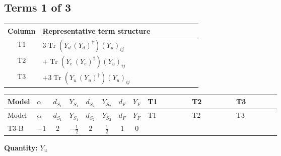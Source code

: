 \documentclass[8pt]{article}
\begin{document}
\begin{landscape}
\subsection*{Terms 1 of 3}
\begin{center}
\begin{tabular}{@{}c >{\raggedright\arraybackslash}p{0.82\linewidth}@{}}
\toprule
Column & Representative term structure \\
\midrule
T1 & \(\displaystyle 3 \operatorname{Tr}\!\left({Y_d}\,\left({Y_d}\right)^{\dagger}\right) \left({Y_u}\right)_{ij}\) \\
\midrule
T2 & \(\displaystyle +\operatorname{Tr}\!\left({Y_e}\,\left({Y_e}\right)^{\dagger}\right) \left({Y_u}\right)_{ij}\) \\
\midrule
T3 & \(\displaystyle +3 \operatorname{Tr}\!\left({Y_u}\,\left({Y_u}\right)^{\dagger}\right) \left({Y_u}\right)_{ij}\) \\
\midrule
\bottomrule
\end{tabular}
\end{center}
\smallskip
\tiny
\begin{longtable}{@{}llcccccc >{\raggedright\arraybackslash}p{0.21\linewidth} >{\raggedright\arraybackslash}p{0.21\linewidth} >{\raggedright\arraybackslash}p{0.21\linewidth}@{}}
\toprule
Model & $\alpha$ & $d_{S_1}$ & $Y_{S_1}$ & $d_{S_2}$ & $Y_{S_2}$ & $d_F$ & $Y_F$ & T1 & T2 & T3 \\
\midrule
\endfirsthead
\toprule
Model & $\alpha$ & $d_{S_1}$ & $Y_{S_1}$ & $d_{S_2}$ & $Y_{S_2}$ & $d_F$ & $Y_F$ & T1 & T2 & T3 \\
\midrule
\endhead
T3-B & $-1$ & $2$ & $-\frac{1}{2}$ & $2$ & $\frac{1}{2}$ & $1$ & $0$ & \scriptsize\adjustbox{max width=\linewidth}{$\begin{gathered} 3 \operatorname{Tr}\!\left({Y_d}\,\left({Y_d}\right)^{\dagger}\right) \left({Y_u}\right)_{ij}\end{gathered}$} & \scriptsize\adjustbox{max width=\linewidth}{$\begin{gathered} +\operatorname{Tr}\!\left({Y_e}\,\left({Y_e}\right)^{\dagger}\right) \left({Y_u}\right)_{ij}\end{gathered}$} & \scriptsize\adjustbox{max width=\linewidth}{$\begin{gathered} +3 \operatorname{Tr}\!\left({Y_u}\,\left({Y_u}\right)^{\dagger}\right) \left({Y_u}\right)_{ij}\end{gathered}$} \\
\midrule
\bottomrule
\end{longtable}
\clearpage
\noindent\textbf{Quantity: }$Y_u$\par\smallskip

\end{landscape}
\end{document}
